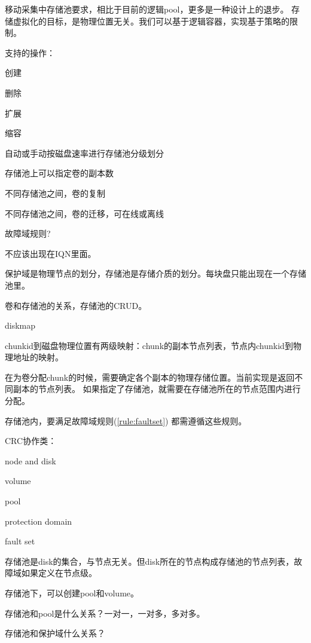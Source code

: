 \begin{tcolorbox}
移动采集中存储池要求，相比于目前的逻辑pool，更多是一种设计上的退步。
存储虚拟化的目标，是物理位置无关。我们可以基于逻辑容器，实现基于策略的限制。
\end{tcolorbox}

支持的操作：
\begin{compactenum}
    \item 创建
    \item 删除
    \item 扩展
    \item 缩容
    \item 自动或手动按磁盘速率进行存储池分级划分
    \item 存储池上可以指定卷的副本数
    \item 不同存储池之间，卷的复制
    \item 不同存储池之间，卷的迁移，可在线或离线
    \item 故障域规则?
\end{compactenum}

不应该出现在IQN里面。

保护域是物理节点的划分，存储池是存储介质的划分。每块盘只能出现在一个存储池里。


卷和存储池的关系，存储池的CRUD。

diskmap

chunkid到磁盘物理位置有两级映射：chunk的副本节点列表，节点内chunkid到物理地址的映射。

在为卷分配chunk的时候，需要确定各个副本的物理存储位置。当前实现是返回不同副本的节点列表。
如果指定了存储池，就需要在存储池所在的节点范围内进行分配。

存储池内，要满足故障域规则(\ref{rule:faultset})
都需遵循这些规则。

CRC协作类：
\begin{compactenum}
    \item node and disk
    \item volume
    \item pool
    \item protection domain
    \item fault set
\end{compactenum}

存储池是disk的集合，与节点无关。但disk所在的节点构成存储池的节点列表，故障域如果定义在节点级。

存储池下，可以创建pool和volume。

存储池和pool是什么关系？一对一，一对多，多对多。

存储池和保护域什么关系？

